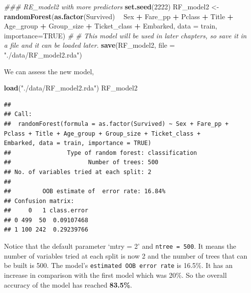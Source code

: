 \documentclass[
]{book}
\newenvironment{Shaded}{\begin{snugshade}}{\end{snugshade}}
\newcommand{\CommentTok}[1]{\textcolor[rgb]{0.56,0.35,0.01}{\textit{#1}}}
\newcommand{\DataTypeTok}[1]{\textcolor[rgb]{0.13,0.29,0.53}{#1}}
\newcommand{\DecValTok}[1]{\textcolor[rgb]{0.00,0.00,0.81}{#1}}
\newcommand{\KeywordTok}[1]{\textcolor[rgb]{0.13,0.29,0.53}{\textbf{#1}}}
\newcommand{\NormalTok}[1]{#1}
\newcommand{\OperatorTok}[1]{\textcolor[rgb]{0.81,0.36,0.00}{\textbf{#1}}}
\newcommand{\OtherTok}[1]{\textcolor[rgb]{0.56,0.35,0.01}{#1}}
\newcommand{\StringTok}[1]{\textcolor[rgb]{0.31,0.60,0.02}{#1}}
\begin{document}
\begin{Shaded}
\begin{Highlighting}[]
\CommentTok{### RE_model2 with more predictors}
\KeywordTok{set.seed}\NormalTok{(}\DecValTok{2222}\NormalTok{)}
\NormalTok{ RF_model2 <-}\StringTok{ }\KeywordTok{randomForest}\NormalTok{(}\KeywordTok{as.factor}\NormalTok{(Survived) }\OperatorTok{~}\StringTok{ }\NormalTok{Sex }\OperatorTok{+}\StringTok{ }\NormalTok{Fare_pp }\OperatorTok{+}\StringTok{ }\NormalTok{Pclass }\OperatorTok{+}\StringTok{ }\NormalTok{Title }\OperatorTok{+}\StringTok{ }\NormalTok{Age_group }\OperatorTok{+}\StringTok{ }\NormalTok{Group_size }\OperatorTok{+}\StringTok{ }\NormalTok{Ticket_class  }\OperatorTok{+}\StringTok{ }\NormalTok{Embarked, }
                          \DataTypeTok{data =}\NormalTok{ train,}
                          \DataTypeTok{importance=}\OtherTok{TRUE}\NormalTok{)}
\CommentTok{# # This model will be used in later chapters, so save it in a file and it can be loaded later.}
 \KeywordTok{save}\NormalTok{(RF_model2, }\DataTypeTok{file =} \StringTok{"./data/RF_model2.rda"}\NormalTok{)}
\end{Highlighting}
\end{Shaded}

We can assess the new model,

\begin{Shaded}
\begin{Highlighting}[]
\KeywordTok{load}\NormalTok{(}\StringTok{"./data/RF_model2.rda"}\NormalTok{)}
\NormalTok{RF_model2}
\end{Highlighting}
\end{Shaded}

\begin{verbatim}
## 
## Call:
##  randomForest(formula = as.factor(Survived) ~ Sex + Fare_pp +      Pclass + Title + Age_group + Group_size + Ticket_class +      Embarked, data = train, importance = TRUE) 
##                Type of random forest: classification
##                      Number of trees: 500
## No. of variables tried at each split: 2
## 
##         OOB estimate of  error rate: 16.84%
## Confusion matrix:
##     0   1 class.error
## 0 499  50  0.09107468
## 1 100 242  0.29239766
\end{verbatim}

Notice that the default parameter `mtry = 2' and \texttt{ntree\ =\ 500}. It means the number of variables tried at each split is now 2 and the number of trees that can be built is 500. The model's \texttt{estimated\ OOB\ error\ rate} is 16.5\%. It has an increase in comparison with the first model which was 20\%. So the overall accuracy of the model has reached \textbf{83.5\%}.
\end{document}
